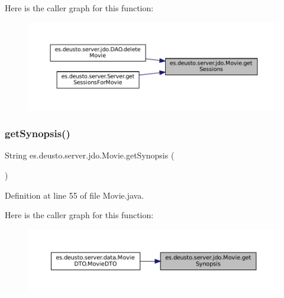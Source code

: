 Here is the caller graph for this function\+:
\nopagebreak
\begin{figure}[H]
\begin{center}
\leavevmode
\includegraphics[width=350pt]{classes_1_1deusto_1_1server_1_1jdo_1_1_movie_a8d94f72339ed5601515e139de313e181_icgraph}
\end{center}
\end{figure}
\mbox{\label{classes_1_1deusto_1_1server_1_1jdo_1_1_movie_a3cd6a8dbcfc02f646bb21d212030dbeb}} 
\subsubsection{\texorpdfstring{getSynopsis()}{getSynopsis()}}
{\footnotesize\ttfamily String es.\+deusto.\+server.\+jdo.\+Movie.\+get\+Synopsis (\begin{DoxyParamCaption}{ }\end{DoxyParamCaption})}



Definition at line 55 of file Movie.\+java.

Here is the caller graph for this function\+:
\nopagebreak
\begin{figure}[H]
\begin{center}
\leavevmode
\includegraphics[width=350pt]{classes_1_1deusto_1_1server_1_1jdo_1_1_movie_a3cd6a8dbcfc02f646bb21d212030dbeb_icgraph}
\end{center}
\end{figure}
\mbox{\label{classes_1_1deusto_1_1server_1_1jdo_1_1_movie_aa69d66c8aa0135b6ae9b809cf0692389}} 

